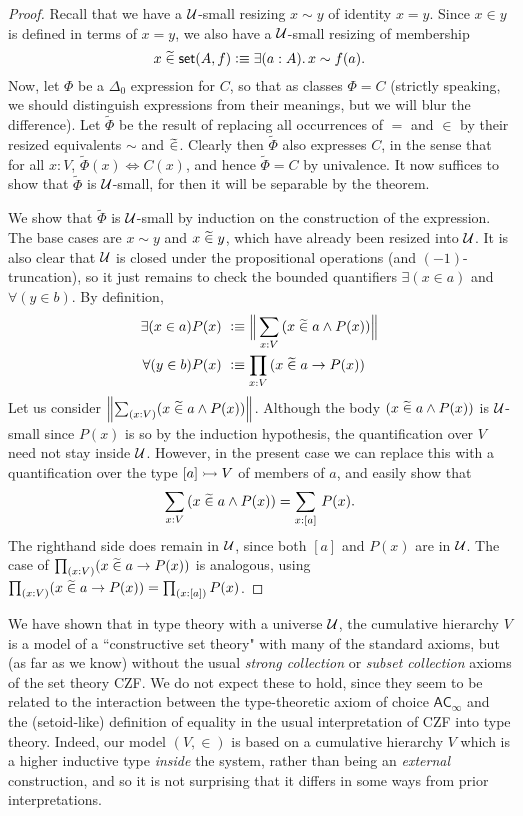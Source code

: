 \begin{proof}
Recall that we have a $\mathcal{U}$-small resizing $x\sim y$ of identity $x = y$. Since $x\in y$ is defined in terms of $x=y$, we also have a $\mathcal{U}$-small resizing of membership $$x\bin\vset(A,f) \defeq \exis{a:A} x\sim f(a).$$ Now, let $\Phi$ be a $\Delta_0$ expression for $C$, so that as classes $\Phi = C$ (strictly speaking, we should distinguish expressions from their meanings, but we will blur the difference). Let $\widetilde{\Phi}$ be the result of replacing all occurrences of $=$ and $\in$ by their resized equivalents $\sim$ and $\mathrel{\widetilde{\in}}$.  Clearly then $\widetilde{\Phi}$ also expresses $C$, in the sense that for all $x:V$, $\widetilde{\Phi}(x) \Leftrightarrow C(x)$, and hence $\widetilde{\Phi}=C$ by univalence.  It now suffices to show that $\widetilde{\Phi}$ is $\mathcal{U}$-small, for then it will be separable by the theorem.  

We show that  $\widetilde{\Phi}$ is $\mathcal{U}$-small by induction on the construction of the expression.  The base cases are $x\sim y$ and $x\mathrel{\widetilde{\in}} y$, which have already been resized into $\mathcal{U}$.  It is also clear that $\mathcal{U}$ is closed under the propositional operations (and $(-1)$-truncation), so it just remains to check the bounded quantifiers $\exists(x\in a)$ and $\forall(y\in b)$.  By definition,  
\begin{align*}
\exists(x\in a) P(x)\ &\defeq \Brck {\sm{x:V}(x\bin a \land P(x))}\\
\forall(y\in b) P(x)\ &\defeq  \prd{x:V}(x\bin a \to P(x))
\end{align*} 
Let us consider $\brck {\sm{x:V}(x\bin a \land P(x))}$.  Although the body $(x\mathrel{\widetilde{\in}} a \land P(x))$ is $\mathcal{U}$-small since $P(x)$ is so by the induction hypothesis, the quantification over $V$ need not stay inside $\mathcal{U}$.  However, in the present case we can replace this with a quantification over the type $[a]\rightarrowtail V$ of members of $a$, and easily show that $$\sm{x:V}(x\bin a \land P(x)) = \sm{x:[a]} P(x).$$ 
The righthand side does remain in $\mathcal{U}$, since both $[a]$ and $P(x)$ are in $\mathcal{U}$.  The case of $\prd{x:V}(x\bin a \to P(x))$ is analogous, using $\prd{x:V}(x\bin a \to P(x)) = \prd{x:[a]}P(x)$.
\end{proof}

We have shown that in type theory with a universe $\mathcal{U}$, the cumulative hierarchy $V$ is a model of a ``constructive set theory" with many of the standard axioms, but (as far as we know) without the usual \emph{strong collection} or \emph{subset collection} axioms of the set theory CZF.  We do not expect these to hold, since they seem to be related to the interaction between the type-theoretic axiom of choice $\mathsf{AC}_\infty$ and the (setoid-like) definition of equality in the usual interpretation of CZF into type theory.  Indeed, our model $(V,\in)$ is based on a cumulative hierarchy $V$ which is a higher inductive type \emph{inside} the system, rather than being an \emph{external} construction, and so it is not surprising that it differs in some ways from prior interpretations.

